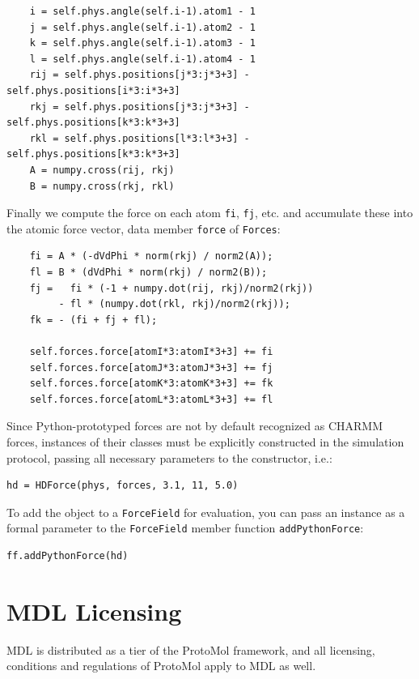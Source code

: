 \documentclass[11pt]{report}
\begin{document}
\begin{verbatim}
    i = self.phys.angle(self.i-1).atom1 - 1
    j = self.phys.angle(self.i-1).atom2 - 1
    k = self.phys.angle(self.i-1).atom3 - 1
    l = self.phys.angle(self.i-1).atom4 - 1
    rij = self.phys.positions[j*3:j*3+3] - self.phys.positions[i*3:i*3+3]
    rkj = self.phys.positions[j*3:j*3+3] - self.phys.positions[k*3:k*3+3]
    rkl = self.phys.positions[l*3:l*3+3] - self.phys.positions[k*3:k*3+3]
    A = numpy.cross(rij, rkj)
    B = numpy.cross(rkj, rkl)
\end{verbatim}

Finally we compute the force on each atom \texttt{fi}, \texttt{fj}, etc.
and accumulate these into the atomic force vector, data member
\texttt{force} of \texttt{Forces}:

\begin{verbatim}
    fi = A * (-dVdPhi * norm(rkj) / norm2(A));
    fl = B * (dVdPhi * norm(rkj) / norm2(B));
    fj =   fi * (-1 + numpy.dot(rij, rkj)/norm2(rkj)) 
         - fl * (numpy.dot(rkl, rkj)/norm2(rkj));
    fk = - (fi + fj + fl);

    self.forces.force[atomI*3:atomI*3+3] += fi
    self.forces.force[atomJ*3:atomJ*3+3] += fj
    self.forces.force[atomK*3:atomK*3+3] += fk
    self.forces.force[atomL*3:atomL*3+3] += fl
\end{verbatim}

Since Python-prototyped forces are not by default recognized as CHARMM
forces, instances of their classes must be explicitly constructed in
the simulation protocol, passing all necessary parameters to the 
constructor, i.e.:

\begin{verbatim}
hd = HDForce(phys, forces, 3.1, 11, 5.0)
\end{verbatim} 

To add the object to a \texttt{ForceField} for evaluation, you can pass an 
instance as a formal parameter to the \texttt{ForceField}
member function \texttt{addPythonForce}:

\begin{verbatim}
ff.addPythonForce(hd)
\end{verbatim}


\chapter{MDL Licensing}

MDL is distributed as a tier of the ProtoMol framework, and all licensing,
conditions and regulations of ProtoMol apply to MDL as well.  
\end{document}
